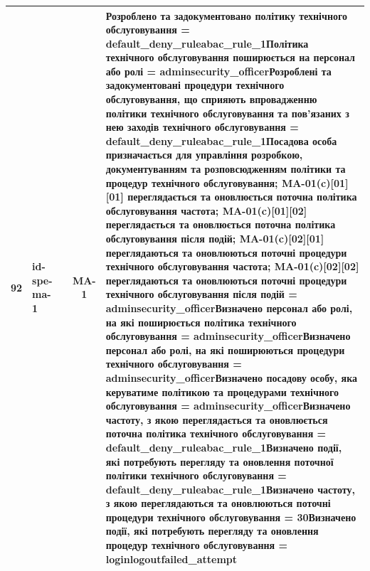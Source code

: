 \documentclass[10pt]{article}
\begin{document}
\begin{longtable}{|c|>{\raggedright\arraybackslash}p{2.5cm}|>{\raggedright\arraybackslash}p{4.5cm}|c|>{\raggedright\arraybackslash}p{4.5cm}|}
92 & id-spe-ma-1 &  & MA-1 & Розроблено та задокументовано політику технічного обслуговування = \textbf{default\_\allowbreak{}deny\_\allowbreak{}ruleabac\_\allowbreak{}rule\_\allowbreak{}1}\newline Політика технічного обслуговування поширюється на персонал або ролі = \textbf{adminsecurity\_\allowbreak{}officer}\newline Розроблені та задокументовані процедури технічного обслуговування, що сприяють впровадженню політики технічного обслуговування та пов'язаних з нею заходів технічного обслуговування = \textbf{default\_\allowbreak{}deny\_\allowbreak{}ruleabac\_\allowbreak{}rule\_\allowbreak{}1}\newline Посадова особа призначається для управління розробкою, документуванням та розповсюдженням політики та процедур технічного обслуговування; MA-01(c)[01][01] переглядається та оновлюється поточна політика обслуговування частота; MA-01(c)[01][02] переглядається та оновлюється поточна політика обслуговування після подій; MA-01(c)[02][01] переглядаються та оновлюються поточні процедури технічного обслуговування частота; MA-01(c)[02][02] переглядаються та оновлюються поточні процедури технічного обслуговування після подій = \textbf{adminsecurity\_\allowbreak{}officer}\newline Визначено персонал або ролі, на які поширюється політика технічного обслуговування = \textbf{adminsecurity\_\allowbreak{}officer}\newline Визначено персонал або ролі, на які поширюються процедури технічного обслуговування = \textbf{adminsecurity\_\allowbreak{}officer}\newline Визначено посадову особу, яка керуватиме політикою та процедурами технічного обслуговування = \textbf{adminsecurity\_\allowbreak{}officer}\newline Визначено частоту, з якою переглядається та оновлюється поточна політика технічного обслуговування = \textbf{default\_\allowbreak{}deny\_\allowbreak{}ruleabac\_\allowbreak{}rule\_\allowbreak{}1}\newline Визначено події, які потребують перегляду та оновлення поточної політики технічного обслуговування = \textbf{default\_\allowbreak{}deny\_\allowbreak{}ruleabac\_\allowbreak{}rule\_\allowbreak{}1}\newline Визначено частоту, з якою переглядаються та оновлюються поточні процедури технічного обслуговування = \textbf{30}\newline Визначено події, які потребують перегляду та оновлення процедур технічного обслуговування = \textbf{loginlogoutfailed\_\allowbreak{}attempt} \\ \hline

\end{longtable}
\end{document}
